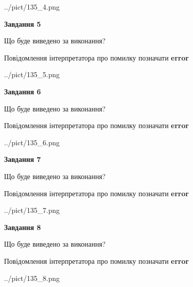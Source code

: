 \documentclass[12pt, ukrainian]{article}
\begin{document}
{\begin{center}
	{../pict/135_4.png}
\end{center}
\newpage

{\begin {center}\textbf{Завдання 5}\end {center}}\par
Що буде виведено за виконання? \par
Повідомлення інтерпретатора про помилку позначати \textbf{error}

\begin{center}
	{../pict/135_5.png}
\end{center}
\newpage

{\begin {center}\textbf{Завдання 6}\end {center}}\par
Що буде виведено за виконання? \par
Повідомлення інтерпретатора про помилку позначати \textbf{error}

\begin{center}
	{../pict/135_6.png}
\end{center}
\newpage

{\begin {center}\textbf{Завдання 7}\end {center}}\par
Що буде виведено за виконання? \par
Повідомлення інтерпретатора про помилку позначати \textbf{error}

\begin{center}
	{../pict/135_7.png}
\end{center}
\newpage

{\begin {center}\textbf{Завдання 8}\end {center}}\par
Що буде виведено за виконання? \par
Повідомлення інтерпретатора про помилку позначати \textbf{error}

\begin{center}
	{../pict/135_8.png}
\end{center}
\newpage

}
\end{document}
